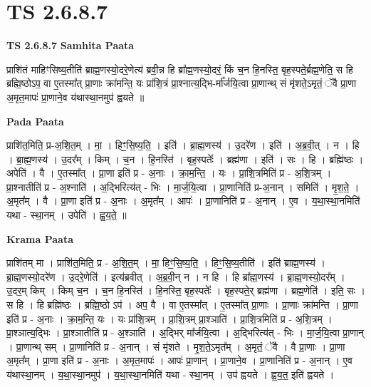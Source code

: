 \documentclass[17pt]{extarticle}
\begin{document}
\section{ TS 2.6.8.7 }

\textbf{TS 2.6.8.7 } \newline
\textbf{Samhita Paata} \newline

प्राशि॑तं माहिꣳसिष्य॒तीति॑ ब्राह्म॒णस्यो॒दरे॒णेत्य॑ ब्रवी॒न्न हि ब्रा᳚ह्म॒णस्यो॒दरं॒ किं च॒न हि॒नस्ति॒ बृह॒स्पते॒र्ब्रह्म॒णेति॒ स हि ब्रह्मि॒ष्ठोऽप॒ वा ए॒तस्मा᳚त् प्रा॒णाः क्रा॑मन्ति॒ यः प्रा॑शि॒त्रं प्रा॒श्नात्य॒द्भि-र्मा᳚र्जयि॒त्वा प्रा॒णान्थ् सं मृ॑शते॒ऽमृतं॒ ॅवै प्रा॒णा अ॒मृत॒मापः॑ प्रा॒णाने॒व य॑थास्था॒नमुप॑ ह्वयते ॥ \newline

\textbf{Pada Paata} \newline

प्राशि॑त॒मिति॒ प्र-अ॒शि॒त॒म् । मा॒ । हिꣳ॒॒सि॒ष्य॒ति॒ । इति॑ । ब्रा॒ह्म॒णस्य॑ । उ॒दरे॑ण । इति॑ । अ॒ब्र॒वी॒त् । न । हि । ब्रा॒ह्म॒णस्य॑ । उ॒दर᳚म् । किम् । च॒न । हि॒नस्ति॑ । बृह॒स्पतेः᳚ । ब्रह्म॑णा । इति॑ । सः । हि । ब्रह्मि॑ष्ठः । अपेति॑ । वै । ए॒तस्मा᳚त् । प्रा॒णा इति॑ प्र - अ॒नाः । क्रा॒म॒न्ति॒ । यः । प्रा॒शि॒त्रमिति॑ प्र - अ॒शि॒त्रम् । प्रा॒श्नातीति॑ प्र - अ॒श्नाति॑ । अ॒द्भिरित्य॑त् - भिः । मा॒र्ज॒यि॒त्वा । प्रा॒णानिति॑ प्र-अ॒नान् । समिति॑ । मृ॒श॒ते॒ । अ॒मृत᳚म् । वै । प्रा॒णा इति॑ प्र - अ॒नाः । अ॒मृत᳚म् । आपः॑ । प्रा॒णानिति॑ प्र - अ॒नान् । ए॒व । य॒था॒स्था॒नमिति॑ यथा - स्था॒नम् । उपेति॑ । ह्व॒य॒ते॒ ॥  \newline


\textbf{Krama Paata} \newline

प्राशि॑तम् मा । प्राशि॑त॒मिति॒ प्र - अ॒शि॒त॒म् । मा॒ हिꣳ॒॒सि॒ष्य॒ति॒ । हिꣳ॒॒सि॒ष्य॒तीति॑ । इति॑ ब्राह्म॒णस्य॑ । ब्रा॒ह्म॒णस्यो॒दरे॑ण । उ॒दरे॒णेति॑ । इत्य॑ब्रवीत् । अ॒ब्र॒वी॒न् न । न हि । हि ब्रा᳚ह्म॒णस्य॑ । ब्रा॒ह्म॒णस्यो॒दर᳚म् । उ॒दर॒म् किम् । किम् च॒न । च॒न हि॒नस्ति॑ । हि॒नस्ति॒ बृह॒स्पतेः᳚ । बृह॒स्पते॒र् ब्रह्म॑णा । ब्रह्म॒णेति॑ । इति॒ सः । स हि । हि ब्रह्मि॑ष्ठः । ब्रह्मि॒ष्ठो ऽप॑ । अप॒ वै । वा ए॒तस्मा᳚त् । ए॒तस्मा᳚त् प्रा॒णाः । प्रा॒णाः क्रा॑मन्ति । प्रा॒णा इति॑ प्र - अ॒नाः । क्रा॒म॒न्ति॒ यः । यः प्रा॑शि॒त्रम् । प्रा॒शि॒त्रम् प्रा॒श्ञाति॑ । प्रा॒शि॒त्रमिति॑ प्र - अ॒शि॒त्रम् । प्रा॒श्ञात्य॒द्भिः । प्रा॒श्ञातीति॑ प्र - अ॒श्ञाति॑ । अ॒द्भिर् मा᳚र्जयि॒त्वा । अ॒द्भिरित्य॑त् - भिः । मा॒र्ज॒यि॒त्वा प्रा॒णान् । प्रा॒णान्थ् सम् । प्रा॒णानिति॑ प्र - अ॒नान् । सं मृ॑शते । मृ॒श॒ते॒ऽमृत᳚म् । अ॒मृतं॒ ॅवै । वै प्रा॒णाः । प्रा॒णा अ॒मृत᳚म् । प्रा॒णा इति॑ प्र - अ॒नाः । अ॒मृत॒मापः॑ । आपः॑ प्रा॒णान् । प्रा॒णाने॒व । प्रा॒णानिति॑ प्र - अ॒नान् । ए॒व य॑थास्था॒नम् । य॒था॒स्था॒नमुप॑ । य॒था॒स्था॒नमिति॑ यथा - स्था॒नम् । उप॑ ह्वयते । ह्व॒य॒त॒ इति॑ ह्वयते । \newline
\end{document}
